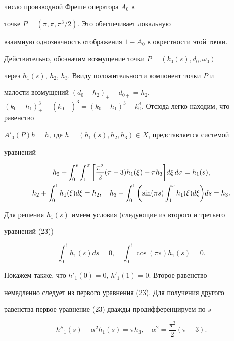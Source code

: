 \begin{pf}
число производной Фреше оператора $A_0$ в


точке ${P=(\pi, \pi, \pi^3/2)}$. Это обеспечивает локальную


взаимную однозначность отображения $1-A_0$ в окрестности этой точки.


Действительно, обозначим возмущение точки $P=(k_0(s), d_0, \omega_0)$


через $h_1(s)$, $h_2$, $h_3$. Ввиду положительности компонент точки $P$ и


малости возмущений $(d_0+h_2)_{+} - d_{0+}=h_2$, $(k_0+h_1)_{+}^3 - (k


_{0+})^3=(k_0+h_1)^3 -k_0^3$. Отсюда легко находим, что равенство


$A'_0(P)h=h$, где $h=(h_1(s), h_2, h_3) \in X$, представляется системой


уравнений


\begin{gather}


h_2+ \int_{0}^{s} \int_{1}^{\sigma}\bigg[ \frac{\pi^2}{2} (\pi-3) h_1(\xi)+


\pi h_3 \bigg] d\xi \,d\sigma=h_1(s),\notag \\


%


h_2+ \int_{0}^{1}h_1(\xi) d\xi=h_2, \quad h_3-\int_0^1


\bigg({\sin(\pi s) \int _1^s h_1  (\xi )d \xi}  \bigg) ds=h_3.


\end{gather}


Для решения $h_1(s)$ имеем условия (следующие из второго и третьего


уравнений (23))


\begin{equation}


\int_{0}^{1} h_1(s) ds=0, \quad \int_0^1{} \cos(\pi s) h_1(s)=0.


\end{equation}


Покажем также, что $h'_1(0)=0$, $h'_1(1)=0$. Второе равенство


немедленно следует из первого уравнения (23). Для получения другого


равенства первое уравнение (23) дважды продифференцируем по $s$


\begin{equation}


h''_1(s)-\alpha^2 h_1(s)=\pi h_3,\quad \alpha^2=\frac{\pi^2}{2}(\pi-3).



\end{equation}
\end{pf}
